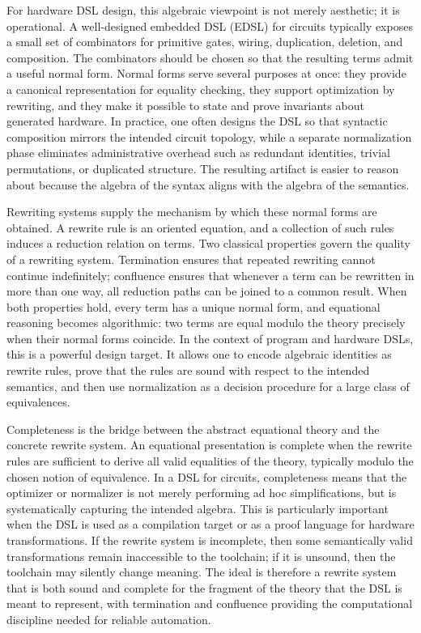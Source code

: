 For hardware DSL design, this algebraic viewpoint is not merely aesthetic; it is operational. A well-designed embedded DSL (EDSL) for circuits typically exposes a small set of combinators for primitive gates, wiring, duplication, deletion, and composition. The combinators should be chosen so that the resulting terms admit a useful normal form. Normal forms serve several purposes at once: they provide a canonical representation for equality checking, they support optimization by rewriting, and they make it possible to state and prove invariants about generated hardware. In practice, one often designs the DSL so that syntactic composition mirrors the intended circuit topology, while a separate normalization phase eliminates administrative overhead such as redundant identities, trivial permutations, or duplicated structure. The resulting artifact is easier to reason about because the algebra of the syntax aligns with the algebra of the semantics.

Rewriting systems supply the mechanism by which these normal forms are obtained. A rewrite rule is an oriented equation, and a collection of such rules induces a reduction relation on terms. Two classical properties govern the quality of a rewriting system. Termination ensures that repeated rewriting cannot continue indefinitely; confluence ensures that whenever a term can be rewritten in more than one way, all reduction paths can be joined to a common result. When both properties hold, every term has a unique normal form, and equational reasoning becomes algorithmic: two terms are equal modulo the theory precisely when their normal forms coincide. In the context of program and hardware DSLs, this is a powerful design target. It allows one to encode algebraic identities as rewrite rules, prove that the rules are sound with respect to the intended semantics, and then use normalization as a decision procedure for a large class of equivalences.

Completeness is the bridge between the abstract equational theory and the concrete rewrite system. An equational presentation is complete when the rewrite rules are sufficient to derive all valid equalities of the theory, typically modulo the chosen notion of equivalence. In a DSL for circuits, completeness means that the optimizer or normalizer is not merely performing ad hoc simplifications, but is systematically capturing the intended algebra. This is particularly important when the DSL is used as a compilation target or as a proof language for hardware transformations. If the rewrite system is incomplete, then some semantically valid transformations remain inaccessible to the toolchain; if it is unsound, then the toolchain may silently change meaning. The ideal is therefore a rewrite system that is both sound and complete for the fragment of the theory that the DSL is meant to represent, with termination and confluence providing the computational discipline needed for reliable automation.

